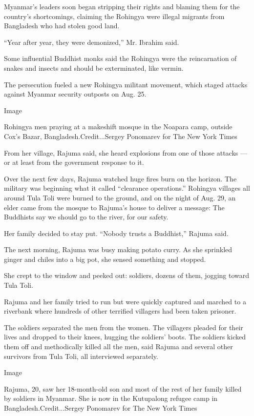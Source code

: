 Myanmar's leaders soon began stripping their rights and blaming them for
the country's shortcomings, claiming the Rohingya were illegal migrants
from Bangladesh who had stolen good land.

``Year after year, they were demonized,'' Mr. Ibrahim said.

Some influential Buddhist monks said the Rohingya were the reincarnation
of snakes and insects and should be exterminated, like vermin.

The persecution fueled a new Rohingya militant movement, which staged
attacks against Myanmar security outposts on Aug. 25.

Image

Rohingya men praying at a makeshift mosque in the Noapara camp, outside
Cox's Bazar, Bangladesh.Credit...Sergey Ponomarev for The New York Times

From her village, Rajuma said, she heard explosions from one of those
attacks --- or at least from the government response to it.

Over the next few days, Rajuma watched huge fires burn on the horizon.
The military was beginning what it called ``clearance operations.''
Rohingya villages all around Tula Toli were burned to the ground, and on
the night of Aug. 29, an elder came from the mosque to Rajuma's house to
deliver a message: The Buddhists say we should go to the river, for our
safety.

Her family decided to stay put. ``Nobody trusts a Buddhist,'' Rajuma
said.

The next morning, Rajuma was busy making potato curry. As she sprinkled
ginger and chiles into a big pot, she sensed something and stopped.

She crept to the window and peeked out: soldiers, dozens of them,
jogging toward Tula Toli.

Rajuma and her family tried to run but were quickly captured and marched
to a riverbank where hundreds of other terrified villagers had been
taken prisoner.

The soldiers separated the men from the women. The villagers pleaded for
their lives and dropped to their knees, hugging the soldiers' boots. The
soldiers kicked them off and methodically killed all the men, said
Rajuma and several other survivors from Tula Toli, all interviewed
separately.

Image

Rajuma, 20, saw her 18-month-old son and most of the rest of her family
killed by soldiers in Myanmar. She is now in the Kutupalong refugee camp
in Bangladesh.Credit...Sergey Ponomarev for The New York Times

